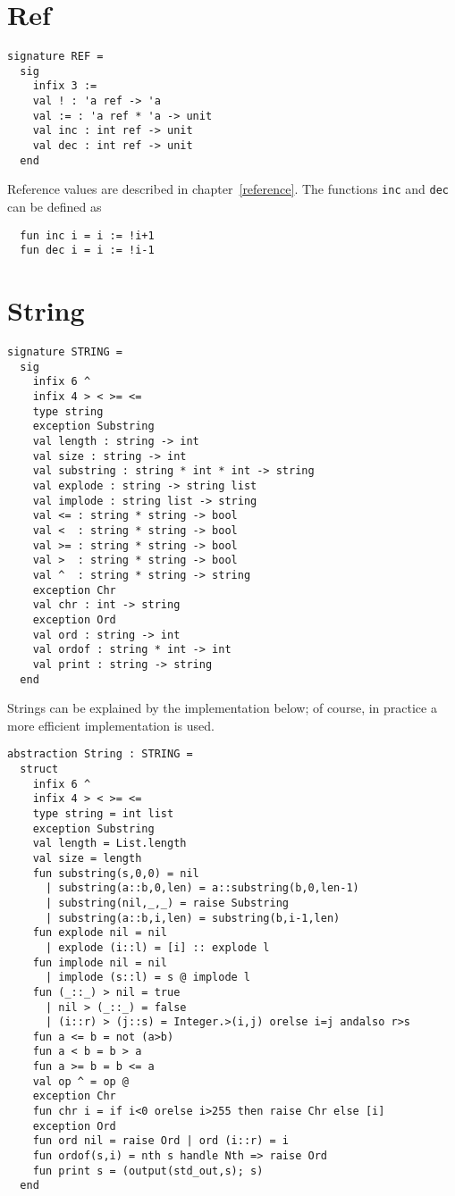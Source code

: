 \section{Ref}
\begin{verbatim}
signature REF = 
  sig
    infix 3 :=
    val ! : 'a ref -> 'a
    val := : 'a ref * 'a -> unit
    val inc : int ref -> unit
    val dec : int ref -> unit
  end
\end{verbatim}

Reference values are described in chapter~\ref{reference}.  The functions
\verb"inc" and \verb"dec" can be defined as
\begin{verbatim}
  fun inc i = i := !i+1
  fun dec i = i := !i-1
\end{verbatim}

\section{String}
\begin{verbatim}
signature STRING =
  sig
    infix 6 ^
    infix 4 > < >= <=
    type string
    exception Substring
    val length : string -> int
    val size : string -> int
    val substring : string * int * int -> string
    val explode : string -> string list
    val implode : string list -> string
    val <= : string * string -> bool
    val <  : string * string -> bool
    val >= : string * string -> bool
    val >  : string * string -> bool
    val ^  : string * string -> string
    exception Chr
    val chr : int -> string 
    exception Ord
    val ord : string -> int 
    val ordof : string * int -> int 
    val print : string -> string
  end
\end{verbatim}
Strings can be explained by the implementation below; of course, in
practice a more efficient implementation is used.
\begin{verbatim}
abstraction String : STRING =
  struct
    infix 6 ^
    infix 4 > < >= <=
    type string = int list
    exception Substring
    val length = List.length
    val size = length
    fun substring(s,0,0) = nil
      | substring(a::b,0,len) = a::substring(b,0,len-1)
      | substring(nil,_,_) = raise Substring
      | substring(a::b,i,len) = substring(b,i-1,len)
    fun explode nil = nil
      | explode (i::l) = [i] :: explode l
    fun implode nil = nil
      | implode (s::l) = s @ implode l
    fun (_::_) > nil = true
      | nil > (_::_) = false
      | (i::r) > (j::s) = Integer.>(i,j) orelse i=j andalso r>s
    fun a <= b = not (a>b)
    fun a < b = b > a
    fun a >= b = b <= a
    val op ^ = op @
    exception Chr
    fun chr i = if i<0 orelse i>255 then raise Chr else [i]
    exception Ord
    fun ord nil = raise Ord | ord (i::r) = i
    fun ordof(s,i) = nth s handle Nth => raise Ord
    fun print s = (output(std_out,s); s)
  end
\end{verbatim}
